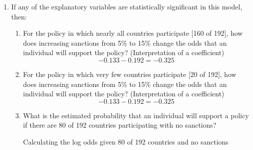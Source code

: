 \documentclass[12pt,letterpaper]{article}
\begin{document}
\begin{enumerate}
\begin{enumerate}
	\end{enumerate}
	\item
	If any of the explanatory variables are statistically significant in this model, then:
	\begin{enumerate}
		\item
		For the policy in which nearly all countries participate [160 of 192], how does increasing sanctions from 5\% to 15\% change the odds that an individual will support the policy? (Interpretation of a coefficient)
		\begin{equation}
	-0.133 - 0.192 = -0.325
\end{equation}
		\item
		For the policy in which very few countries participate [20 of 192], how does increasing sanctions from 5\% to 15\% change the odds that an individual will support the policy? (Interpretation of a coefficient)
		\begin{equation}
			-0.133 - 0.192 = -0.325
		\end{equation}
		\item
		What is the estimated probability that an individual will support a policy if there are 80 of 192 countries participating with no sanctions? 
	\begin{description}
		\item[Calculating the log odds given 80 of 192 countries and no sanctions ] 
	\end{description}

\end{enumerate}
\end{enumerate}
\end{document}
